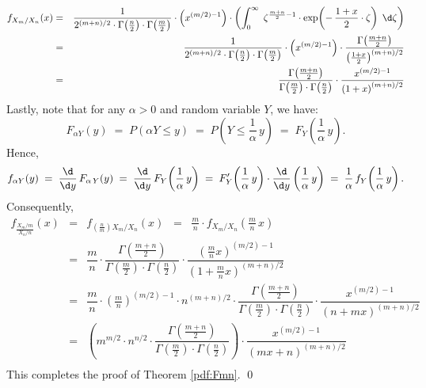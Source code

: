 \documentclass{article}
\begin{document}
\begin{eqnarray*}
f_{X_{m}/X_{n}}(x)
&=&
\dfrac{1}{2^{(m+n)/2}\cdot\Gamma\!\left(\frac{n}{2}\right)\cdot\Gamma\!\left(\frac{m}{2}\right)} \cdot
\left(x^{(m/2)-1}\right) \cdot
\left(\int_{0}^{\infty}\;
\zeta^{\frac{m+n}{2}-1}\cdot \exp\!\left(-\,\frac{1+x}{2}\cdot\zeta\right)
\;\d\zeta\right) \\
&=&
\dfrac{1}{2^{(m+n)/2}\cdot\Gamma\!\left(\frac{n}{2}\right)\cdot\Gamma\!\left(\frac{m}{2}\right)} \cdot
\left(x^{(m/2)-1}\right) \cdot
\dfrac{\Gamma\!\left(\frac{m+n}{2}\right)}{\left(\frac{1+x}{2}\right)^{(m+n)/2}} \\
&=&
\dfrac{\Gamma\!\left(\frac{m+n}{2}\right)}{\Gamma\!\left(\frac{m}{2}\right)\cdot\Gamma\!\left(\frac{n}{2}\right)}
\cdot
\dfrac{x^{(m/2)-1}}{\left(1+x\right)^{(m+n)/2}} \\
\end{eqnarray*}
Lastly, note that for any $\alpha > 0$ and random variable $Y$, we have:
\begin{equation*}
       F_{\alpha Y}(y)
\;=\; P\!\left(\alpha Y\leq y\right)
\;=\; P\!\left(Y\leq\frac{1}{\alpha}\,y\right)
\;=\; F_{Y}\!\left(\frac{1}{\alpha}\,y\right).
\end{equation*}
Hence,
\begin{equation*}
       f_{\alpha Y}(y)
\;=\; \dfrac{\d}{\d y}\,F_{\alpha\,Y}(y)
\;=\; \dfrac{\d}{\d y}\,F_{Y}\!\left(\frac{1}{\alpha}\,y\right)
\;=\; F'_{Y}\!\left(\frac{1}{\alpha}\,y\right)\cdot\dfrac{\d}{\d y}\left(\frac{1}{\alpha}\,y\right)
\;=\; \frac{1}{\alpha}\,f_{Y}\!\left(\frac{1}{\alpha}\,y\right).
\end{equation*}
Consequently,
\begin{eqnarray*}
            f_{\frac{X_{m}/m}{X_{n}/n}}(x)
&=&     f_{\left(\frac{n}{m}\right)X_{m}/X_{n}}(x)
\;\;=\;\; \frac{m}{n}\cdot f_{X_{m}/X_{n}}\!\left(\frac{m}{n}\,x\right) \\
&=&     \dfrac{m}{n}\cdot
            \dfrac{\Gamma\!\left(\frac{m+n}{2}\right)}{\Gamma\!\left(\frac{m}{2}\right)\cdot\Gamma\!\left(\frac{n}{2}\right)}
            \cdot
            \dfrac{\left(\frac{m}{n} x\right)^{(m/2)-1}}{\left(1+\frac{m}{n} x\right)^{(m+n)/2}} \\
&=&     \dfrac{m}{n}\cdot\left(\frac{m}{n}\right)^{(m/2)-1}\cdot n^{(m+n)/2}\cdot
            \dfrac{\Gamma\!\left(\frac{m+n}{2}\right)}{\Gamma\!\left(\frac{m}{2}\right)\cdot\Gamma\!\left(\frac{n}{2}\right)}
            \cdot
            \dfrac{x^{(m/2)-1}}{\left(n+mx\right)^{(m+n)/2}} \\
&=&     \left(
           m^{m/2} \cdot n^{n/2} \cdot
           \dfrac{\Gamma\!\left(\frac{m+n}{2}\right)}{\Gamma\!\left(\frac{m}{2}\right)\cdot\Gamma\!\left(\frac{n}{2}\right)}
           \right)
           \cdot
           \dfrac{x^{(m/2)-1}}{\left(mx+n\right)^{(m+n)/2}} \\
\end{eqnarray*}
This completes the proof of Theorem \ref{pdf:Fmn}.  \qed
\end{document}

